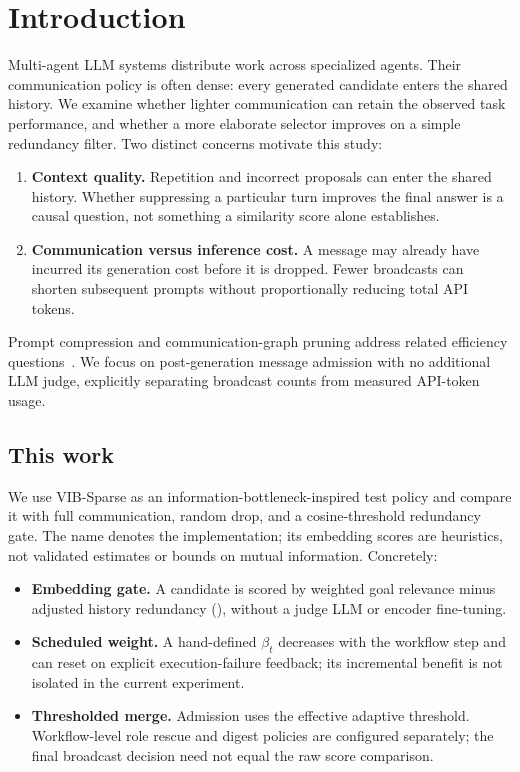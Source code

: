 \documentclass[11pt,twoside,twocolumn,letterpaper]{article}
\begin{document}
\section{Introduction}
Multi-agent LLM systems distribute work across specialized agents. Their communication policy is often dense: every generated candidate enters the shared history. We examine whether lighter communication can retain the observed task performance, and whether a more elaborate selector improves on a simple redundancy filter. Two distinct concerns motivate this study:
\begin{enumerate}
\item \textbf{Context quality.} Repetition and incorrect proposals can enter the shared history. Whether suppressing a particular turn improves the final answer is a causal question, not something a similarity score alone establishes.
\item \textbf{Communication versus inference cost.} A message may already have incurred its generation cost before it is dropped. Fewer broadcasts can shorten subsequent prompts without proportionally reducing total API tokens.
\end{enumerate}

Prompt compression and communication-graph pruning address related efficiency questions~\cite{jiang2023llmlingua,zhang2024agentprune}. We focus on post-generation message admission with no additional LLM judge, explicitly separating broadcast counts from measured API-token usage.

\subsection{This work}
We use VIB-Sparse as an information-bottleneck-inspired test policy and compare it with full communication, random drop, and a cosine-threshold redundancy gate. The name denotes the implementation; its embedding scores are heuristics, not validated estimates or bounds on mutual information. Concretely:
\begin{itemize}
\item \textbf{Embedding gate.} A candidate is scored by weighted goal relevance minus adjusted history redundancy (), without a judge LLM or encoder fine-tuning.
\item \textbf{Scheduled weight.} A hand-defined $\beta_t$ decreases with the workflow step and can reset on explicit execution-failure feedback; its incremental benefit is not isolated in the current experiment.
\item \textbf{Thresholded merge.} Admission uses the effective adaptive threshold. Workflow-level role rescue and digest policies are configured separately; the final broadcast decision need not equal the raw score comparison.
\end{itemize}
\end{document}
